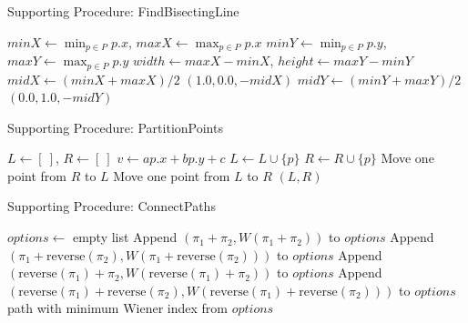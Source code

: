 \documentclass[11pt]{beamer}
\begin{document}
\begin{frame}{Supporting Procedure: FindBisectingLine}
	\begin{algorithm}[H]
		\caption{FindBisectingLine($P$)}
		\begin{algorithmic}[1]
			\State $minX \gets \min_{p \in P} p.x$, $maxX \gets \max_{p \in P} p.x$
			\State $minY \gets \min_{p \in P} p.y$, $maxY \gets \max_{p \in P} p.y$
			\State $width \gets maxX - minX$, $height \gets maxY - minY$
			\State $midX \gets (minX + maxX)/2$
			\State \Return $(1.0, 0.0, -midX)$ 
			\Else
			\State $midY \gets (minY + maxY)/2$
			\State \Return $(0.0, 1.0, -midY)$ 
			\EndIf
			\EndProcedure
		\end{algorithmic}
	\end{algorithm}
\end{frame}

\begin{frame}{Supporting Procedure: PartitionPoints}
	\begin{algorithm}[H]
		\caption{PartitionPoints($P$, $a$, $b$, $c$)}
		\begin{algorithmic}[1]
			\State $L \gets [\ ]$, $R \gets [\ ]$
			\State $v \gets ap.x + bp.y + c$
			\State $L \gets L \cup \{p\}$
			\Else
			\State $R \gets R \cup \{p\}$
			\EndIf
			\EndFor
			\State Move one point from $R$ to $L$
			\State Move one point from $L$ to $R$
			\EndIf
			\State \Return $(L, R)$
			\EndProcedure
		\end{algorithmic}
	\end{algorithm}
\end{frame}

\begin{frame}{Supporting Procedure: ConnectPaths}
	\begin{algorithm}[H]
		\caption{ConnectPaths($\pi_1$, $\pi_2$)}
		\begin{algorithmic}[1]
			\State $options \gets$ empty list
			\State Append $(\pi_1 + \pi_2, W(\pi_1 + \pi_2))$ to $options$
			\State Append $(\pi_1 + \text{reverse}(\pi_2), W(\pi_1 + \text{reverse}(\pi_2)))$ to $options$
			\State Append $(\text{reverse}(\pi_1) + \pi_2, W(\text{reverse}(\pi_1) + \pi_2))$ to $options$
			\State Append $(\text{reverse}(\pi_1) + \text{reverse}(\pi_2), W(\text{reverse}(\pi_1) + \text{reverse}(\pi_2)))$ to $options$
			\State \Return path with minimum Wiener index from $options$
			\EndProcedure
		\end{algorithmic}
	\end{algorithm}
\end{frame}
\end{document}
